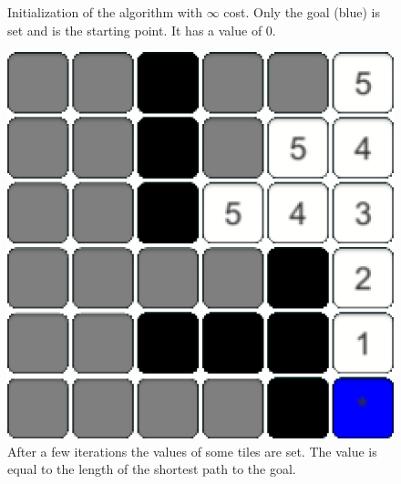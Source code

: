 \documentclass[conference]{IEEEtran}
\begin{document}
\begin{figure}[h]
\begin{minipage}[t]{0.3\linewidth}
\caption{Initialization of the algorithm with $\infty$ cost. Only the goal (blue) is set and is the starting point. It has a value of 0.}
\end{minipage}
\hfill
\begin{minipage}[t]{0.3\linewidth}
\centering
\includegraphics[width=1\textwidth]{images/intro/few.png}
\caption{After a few iterations the values of some tiles are set. The value is equal to the length of the shortest path to the goal.}
\end{minipage}
\end{figure}
\end{document}
